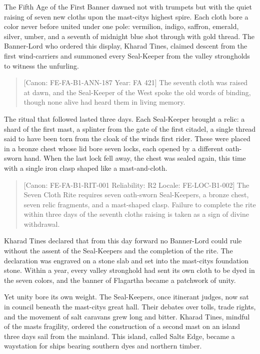 The Fifth Age of the First Banner dawned not with trumpets but with the
quiet raising of seven new cloths upon the mast-city\textquotesingle s
highest spire. Each cloth bore a color never before united under one
pole: vermilion, indigo, saffron, emerald, silver, umber, and a seventh
of midnight blue shot through with gold thread. The Banner-Lord who
ordered this display, Kharad Tines, claimed descent from the first
wind-carriers and summoned every Seal-Keeper from the valley strongholds
to witness the unfurling.

\begin{quote}
{[}Canon: FE-FA-B1-ANN-187 \textbar{} Year: FA 421{]} The seventh cloth
was raised at dawn, and the Seal-Keeper of the West spoke the old words
of binding, though none alive had heard them in living memory.
\end{quote}

The ritual that followed lasted three days. Each Seal-Keeper brought a
relic: a shard of the first mast, a splinter from the gate of the first
citadel, a single thread said to have been torn from the cloak of the
wind\textquotesingle s first rider. These were placed in a bronze chest
whose lid bore seven locks, each opened by a different oath-sworn hand.
When the last lock fell away, the chest was sealed again, this time with
a single iron clasp shaped like a mast-and-cloth.

\begin{quote}
{[}Canon: FE-FA-B1-RIT-001 \textbar{} Reliability: R2 \textbar{} Locale:
FE-LOC-B1-002{]} The Seven Cloth Rite requires seven oath-sworn
Seal-Keepers, a bronze chest, seven relic fragments, and a mast-shaped
clasp. Failure to complete the rite within three days of the seventh
cloth\textquotesingle s raising is taken as a sign of divine withdrawal.
\end{quote}

Kharad Tines declared that from this day forward no Banner-Lord could
rule without the assent of the Seal-Keepers and the completion of the
rite. The declaration was engraved on a stone slab and set into the
mast-city\textquotesingle s foundation stone. Within a year, every
valley stronghold had sent its own cloth to be dyed in the seven colors,
and the banner of Flagartha became a patchwork of unity.

Yet unity bore its own weight. The Seal-Keepers, once itinerant judges,
now sat in council beneath the mast-city\textquotesingle s great hall.
Their debates over tolls, trade rights, and the movement of salt
caravans grew long and bitter. Kharad Tines, mindful of the
mast\textquotesingle s fragility, ordered the construction of a second
mast on an island three days\textquotesingle{} sail from the mainland.
This island, called Salt\textquotesingle s Edge, became a waystation for
ships bearing southern dyes and northern timber.

